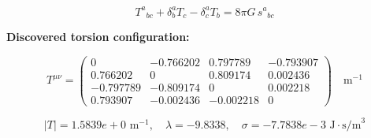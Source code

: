 
\begin{equation}
  T^a{}_{bc} + \delta^a_b T_c - \delta^a_c T_b = 8\pi G \, s^a{}_{bc}
\end{equation}

\textbf{Discovered torsion configuration:}

\begin{equation}
  T^{\mu\nu} = \begin{pmatrix}
    0 & -0.766202 & 0.797789 & -0.793907 \\
    0.766202 & 0 & 0.809174 & 0.002436 \\
    -0.797789 & -0.809174 & 0 & 0.002218 \\
    0.793907 & -0.002436 & -0.002218 & 0
  \end{pmatrix} \quad \text{m}^{-1}
\end{equation}

\begin{equation}
  |T| = 1.5839e+0 \text{ m}^{-1}, \quad
  \lambda = -9.8338, \quad
  \sigma = -7.7838e-3 \text{ J}\cdot\text{s/m}^3
\end{equation}